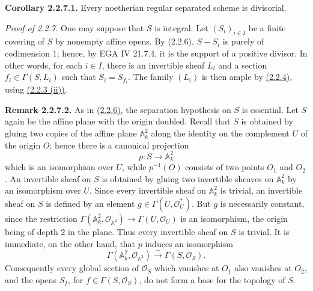 \textbf{Corollary 2.2.7.1.} Every noetherian regular separated scheme is divisorial.

\emph{Proof of 2.2.7.} One may suppose that $S$ is integral. Let $(S_i)_{i\in I}$ be a finite covering of $S$ by nonempty affine opens. By (2.2.6), $S-S_i$ is purely of codimension $1$; hence, by EGA IV 21.7.4, it is the support of a positive divisor. In other words, for each $i\in I$, there is an invertible sheaf $L_i$ and a section $f_i\in\Gamma(S,L_i)$ such that $S_i=S_{f_i}$. The family $(L_i)$ is then ample by \hyperlink{sga6.e02.def.2-2-4}{(2.2.4)}, using \hyperlink{sga6.e02.prop.2-2-3}{(2.2.3 (ii))}.

\textbf{Remark 2.2.7.2.} As in \hyperlink{sga6.e02.lem.2-2-6}{(2.2.6)}, the separation hypothesis on $S$ is essential. Let $S$ again be the affine plane with the origin doubled. Recall that $S$ is obtained by gluing two copies of the affine plane $\mathbb A^2_k$ along the identity on the complement $U$ of the origin $O$; hence there is a canonical projection
\[
p:S\longrightarrow\mathbb A^2_k
\]
which is an isomorphism over $U$, while $p^{-1}(O)$ consists of two points $O_1$ and $O_2$. An invertible sheaf on $S$ is obtained by gluing two invertible sheaves on $\mathbb A^2_k$ by an isomorphism over $U$. Since every invertible sheaf on $\mathbb A^2_k$ is trivial, an invertible sheaf on $S$ is defined by an element $g\in\Gamma(U,\mathcal O_U^*)$. But $g$ is necessarily constant, since the restriction $\Gamma(\mathbb A^2_k,\mathcal O_{\mathbb A^2})\to\Gamma(U,\mathcal O_U)$ is an isomorphism, the origin being of depth $2$ in the plane. Thus every invertible sheaf on $S$ is trivial. It is immediate, on the other hand, that $p$ induces an isomorphism
\[
\Gamma(\mathbb A^2_k,\mathcal O_{\mathbb A^2})\xrightarrow{\sim}\Gamma(S,\mathcal O_S).
\]
Consequently every global section of $\mathcal O_S$ which vanishes at $O_1$ also vanishes at $O_2$, and the opens $S_f$, for $f\in\Gamma(S,\mathcal O_S)$, do not form a base for the topology of $S$.


